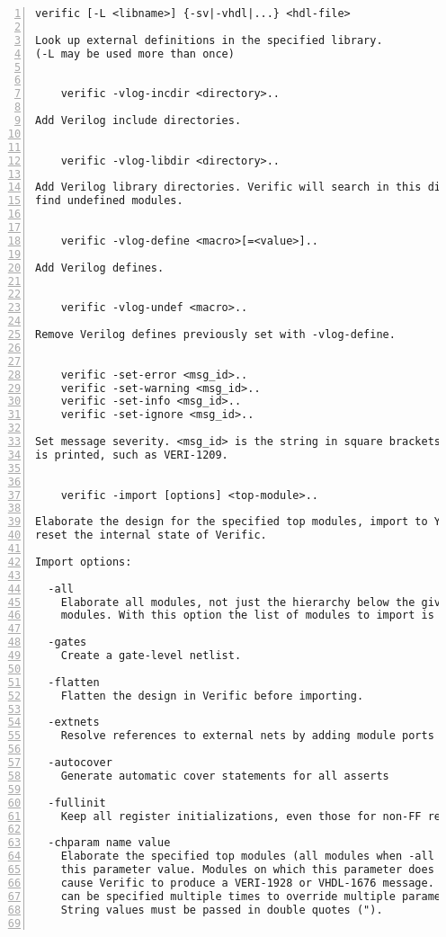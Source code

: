 \begin{lstlisting}[numbers=left,frame=single]
    verific [-L <libname>] {-sv|-vhdl|...} <hdl-file>

Look up external definitions in the specified library.
(-L may be used more than once)


    verific -vlog-incdir <directory>..

Add Verilog include directories.


    verific -vlog-libdir <directory>..

Add Verilog library directories. Verific will search in this directories to
find undefined modules.


    verific -vlog-define <macro>[=<value>]..

Add Verilog defines.


    verific -vlog-undef <macro>..

Remove Verilog defines previously set with -vlog-define.


    verific -set-error <msg_id>..
    verific -set-warning <msg_id>..
    verific -set-info <msg_id>..
    verific -set-ignore <msg_id>..

Set message severity. <msg_id> is the string in square brackets when a message
is printed, such as VERI-1209.


    verific -import [options] <top-module>..

Elaborate the design for the specified top modules, import to Yosys and
reset the internal state of Verific.

Import options:

  -all
    Elaborate all modules, not just the hierarchy below the given top
    modules. With this option the list of modules to import is optional.

  -gates
    Create a gate-level netlist.

  -flatten
    Flatten the design in Verific before importing.

  -extnets
    Resolve references to external nets by adding module ports as needed.

  -autocover
    Generate automatic cover statements for all asserts

  -fullinit
    Keep all register initializations, even those for non-FF registers.

  -chparam name value 
    Elaborate the specified top modules (all modules when -all given) using
    this parameter value. Modules on which this parameter does not exist will
    cause Verific to produce a VERI-1928 or VHDL-1676 message. This option
    can be specified multiple times to override multiple parameters.
    String values must be passed in double quotes (").


\end{lstlisting}
